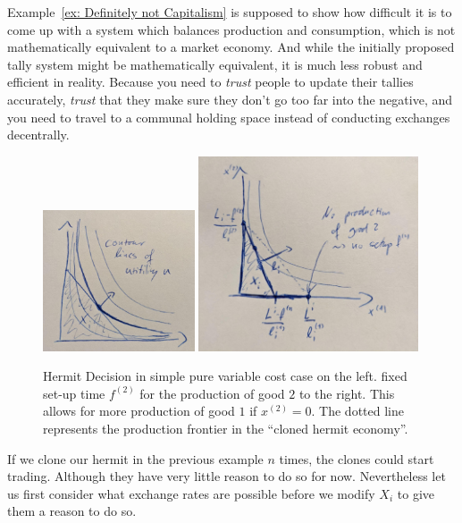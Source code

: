 \begin{remark}
	Example~\ref{ex: Definitely not Capitalism} is supposed to show how difficult
	it is to come up with a system which balances production and consumption,
	which is not mathematically equivalent to a market economy. And while the
	initially proposed tally system might be mathematically equivalent, it is
	much less robust and efficient in reality. Because you need to \emph{trust}
	people to update their tallies accurately, \emph{trust} that they make sure
	they don't go too far into the negative, and you need to travel to a
	communal holding space instead of conducting exchanges decentrally.
\end{remark}





\begin{figure}
	\includegraphics[width=0.4\textwidth]{images/hermit-decision-pure-variable.jpeg}
	\includegraphics[width=0.58\textwidth]{images/hermit-decision-setup-cost.jpeg}
	\caption{Hermit Decision in simple pure variable cost case on the left.
	fixed set-up time \(f^{(2)}\) for the production of good \(2\) to the right.
	This allows for more production of good \(1\) if \(x^{(2)}=0\). The dotted
	line represents the production frontier in the ``cloned hermit economy''.}
\end{figure}
\begin{example}
	If we clone our hermit in the previous example \(n\) times, the clones could
	start trading. Although they have very little reason to do so for now.
	Nevertheless let us first consider what exchange rates are possible before
	we modify \(X_i\) to give them a reason to do so.
\end{example}
